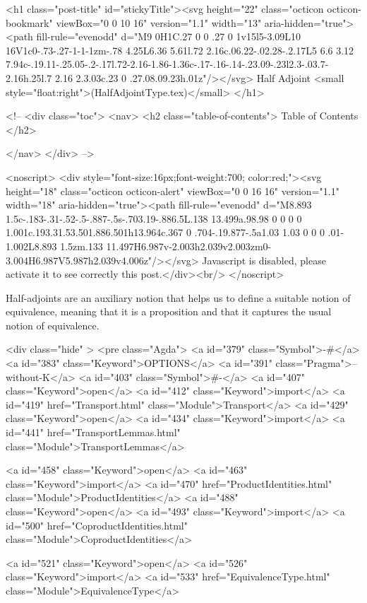   <h1 class="post-title" id="stickyTitle"><svg height="22" class="octicon octicon-bookmark" viewBox="0 0 10 16" version="1.1" width="13" aria-hidden="true"><path fill-rule="evenodd" d="M9 0H1C.27 0 0 .27 0 1v15l5-3.09L10 16V1c0-.73-.27-1-1-1zm-.78 4.25L6.36 5.61l.72 2.16c.06.22-.02.28-.2.17L5 6.6 3.12 7.94c-.19.11-.25.05-.2-.17l.72-2.16-1.86-1.36c-.17-.16-.14-.23.09-.23l2.3-.03.7-2.16h.25l.7 2.16 2.3.03c.23 0 .27.08.09.23h.01z"/></svg> Half Adjoint <small style="float:right">(HalfAdjointType.tex)</small>
  </h1>

  <!-- 
  <div class="toc">
    <nav>
    <h2 class="table-of-contents"> Table of Contents </h2>
      

    </nav>
  </div>
   -->

  <noscript>
  <div style="font-size:16px;font-weight:700; color:red;"><svg height="18" class="octicon octicon-alert" viewBox="0 0 16 16" version="1.1" width="18" aria-hidden="true"><path fill-rule="evenodd" d="M8.893 1.5c-.183-.31-.52-.5-.887-.5s-.703.19-.886.5L.138 13.499a.98.98 0 0 0 0 1.001c.193.31.53.501.886.501h13.964c.367 0 .704-.19.877-.5a1.03 1.03 0 0 0 .01-1.002L8.893 1.5zm.133 11.497H6.987v-2.003h2.039v2.003zm0-3.004H6.987V5.987h2.039v4.006z"/></svg> Javascript is disabled, please activate it to see correctly this post.</div><br/>
  </noscript>

  Half-adjoints are an auxiliary notion that helps us to define a suitable notion
of equivalence, meaning that it is a proposition and that it captures the usual
notion of equivalence.

<div class="hide" >
<pre class="Agda">
<a id="379" class="Symbol">{-#</a> <a id="383" class="Keyword">OPTIONS</a> <a id="391" class="Pragma">--without-K</a> <a id="403" class="Symbol">#-}</a>
<a id="407" class="Keyword">open</a> <a id="412" class="Keyword">import</a> <a id="419" href="Transport.html" class="Module">Transport</a>
<a id="429" class="Keyword">open</a> <a id="434" class="Keyword">import</a> <a id="441" href="TransportLemmas.html" class="Module">TransportLemmas</a>

<a id="458" class="Keyword">open</a> <a id="463" class="Keyword">import</a> <a id="470" href="ProductIdentities.html" class="Module">ProductIdentities</a>
<a id="488" class="Keyword">open</a> <a id="493" class="Keyword">import</a> <a id="500" href="CoproductIdentities.html" class="Module">CoproductIdentities</a>

<a id="521" class="Keyword">open</a> <a id="526" class="Keyword">import</a> <a id="533" href="EquivalenceType.html" class="Module">EquivalenceType</a>


